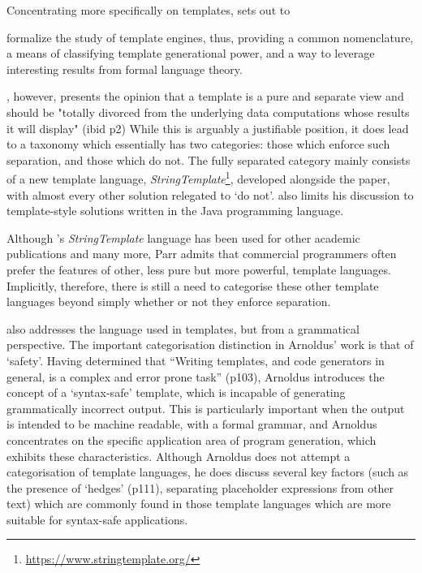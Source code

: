 Concentrating more specifically on templates, \citet{Parr2004} sets out to 

\begin{displayquote}
formalize the study of template engines, thus, providing a common nomenclature, a means of classifying template generational power, and a way to leverage interesting results from formal language theory. \citep{Parr2004}
\end{displayquote}

\citeauthor{Parr2004}, however, presents the opinion that a template is a pure and separate view and should be "totally divorced from the underlying data computations whose results it will display" (ibid p2) While this is arguably a justifiable position, it does lead to a taxonomy which essentially has two categories: those which enforce such separation, and those which do not. The fully separated category mainly consists of a new template language, \emph{StringTemplate}\footnote{\url{https://www.stringtemplate.org/}}, developed alongside the paper, with almost every other solution relegated to `do not'. \citeauthor{Parr2004} also limits his discussion to template-style solutions written in the Java programming language.

Although \citeauthor{Parr2004}'s \emph{StringTemplate} language has been used for other academic publications \citep{Fritzson2009} \citep{Arnoldus2010} \citep{Hartmann2011} \citep{Arnoldus2012} \citep{Vollebregt2012} and many more, Parr admits that commercial programmers often prefer the features of other, less pure but more powerful, template languages. Implicitly, therefore, there is still a need to categorise these other template languages beyond simply whether or not they enforce separation.

\citet{Arnoldus2010} also addresses the language used in templates, but from a grammatical perspective. The important categorisation distinction in Arnoldus’ work is that of `safety'. Having determined that \enquote{Writing templates, and code generators in general, is a complex and error prone task} (p103), Arnoldus introduces the concept of a `syntax-safe' template, which is incapable of generating grammatically incorrect output. This is particularly important when the output is intended to be machine readable, with a formal grammar, and Arnoldus concentrates on the specific application area of program generation, which exhibits these characteristics. Although Arnoldus does not attempt a categorisation of template languages, he does discuss several key factors (such as the presence of `hedges' (p111), separating placeholder expressions from other text) which are commonly found in those template languages which are more suitable for syntax-safe applications.

